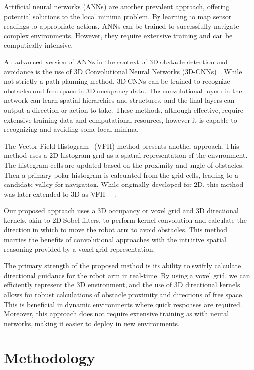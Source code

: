 \documentclass[a4paper]{article}
\begin{document}
Artificial neural networks (ANNs) are another prevalent approach, offering potential solutions to the local minima problem. By learning to map sensor readings to appropriate actions, ANNs can be trained to successfully navigate complex environments. However, they require extensive training and can be computically intensive.

An advanced version of ANNs in the context of 3D obstacle detection and avoidance is the use of 3D Convolutional Neural Networks (3D-CNNs)~\cite{Duguleana2011}. While not strictly a path planning method, 3D-CNNs can be trained to recognize obstacles and free space in 3D occupancy data. The convolutional layers in the network can learn spatial hierarchies and structures, and the final layers can output a direction or action to take. These methods, although effective, require extensive training data and computational resources, however it is capable to recognizing and avoiding some local minima. 

The Vector Field Histogram~\cite{Borenstein1991} (VFH) method presents another approach. This method uses a 2D histogram grid as a spatial representation of the environment. The histogram cells are updated based on the proximity and angle of obstacles. Then a primary polar histogram is calculated from the grid cells, leading to a candidate valley for navigation. While originally developed for 2D, this method was later extended to 3D as VFH+~\cite{Ulrich1998}.

Our proposed approach uses a 3D occupancy or voxel grid and 3D directional kernels, akin to 2D Sobel filters, to perform kernel convolution and calculate the direction in which to move the robot arm to avoid obstacles. This method marries the benefits of convolutional approaches with the intuitive spatial reasoning provided by a voxel grid representation.

The primary strength of the proposed method is its ability to swiftly calculate directional guidance for the robot arm in real-time. By using a voxel grid, we can efficiently represent the 3D environment, and the use of 3D directional kernels allows for robust calculations of obstacle proximity and directions of free space. This is beneficial in dynamic environments where quick responses are required. Moreover, this approach does not require extensive training as with neural networks, making it easier to deploy in new environments. 

\section{Methodology }
\end{document}
